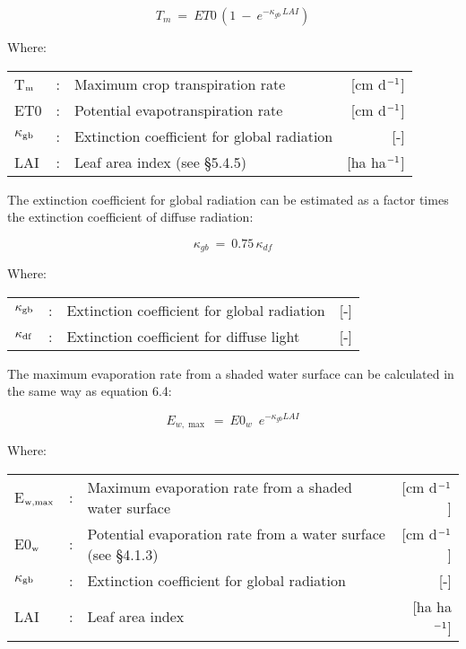 \begin{equation}
T _{m} ~=~ ET0\, (1~-~e ^{-\kappa _{gb} \, LAI} )
\end{equation}
 
Where:\\[5pt]
\begin{tabularx}{\textwidth}{llXr}
T$_{{\rm m}}$ &:& Maximum crop transpiration rate & [cm d$^{{\rm -1}}$]\\
ET0 &:& Potential evapotranspiration rate & [cm d$^{{\rm -1}}$]\\
$\kappa$$_{{\rm gb}}$ &:& Extinction coefficient for global radiation & [-]\\
LAI &:& Leaf area index (see \S 5.4.5) & [ha ha$^{{\rm -1}}$]\\
\end{tabularx}

The extinction coefficient for global radiation can be estimated as a factor times the
extinction coefficient of diffuse radiation:

\begin{equation}
\kappa_{gb} ~=~ 0.75\, \kappa_{df} 
\end{equation}

Where:\\[5pt]
\begin{tabularx}{\textwidth}{llXr}
$\kappa_{{\rm gb}}$ &:& Extinction coefficient for global radiation & [-]\\
$\kappa_{{\rm df}}$ &:& Extinction coefficient for diffuse light & [-]\\
\end{tabularx}

The maximum evaporation rate from a shaded water surface can be calculated in the same
way as equation 6.4: 

\begin{equation}
E _{w,\max } ~=~ E0 _{w} \,\,\, e ^{-\kappa  _{gb} LAI}
\end{equation}

Where:\\[5pt]
\begin{tabularx}{\textwidth}{llXr}
E$_{{\rm w,max}}$ &:& Maximum evaporation rate from a shaded water surface & [cm d$^{{\rm -1}}$]\\
E0$_{{\rm w}}$ &:& Potential evaporation rate from a water surface (see \S 4.1.3) & [cm d$^{{\rm -1}}$]\\
$\kappa$$_{{\rm gb}}$ &:& Extinction coefficient for global radiation & [-]\\
LAI &:& Leaf area index & [ha ha$^{{\rm -1}}$]\\
\end{tabularx}

